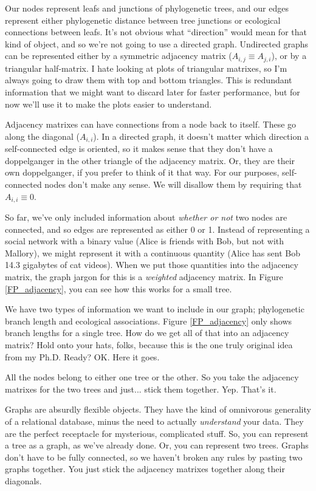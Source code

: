 \documentclass[
10pt, %
a4paper, %
oneside, %
headinclude,footinclude, %
BCOR5mm, %
]{scrartcl}
\begin{document}


Our nodes represent leafs and junctions of phylogenetic trees, and our edges represent either phylogenetic distance between tree junctions or ecological connections between leafs. It's not obvious what ``direction'' would mean for that kind of object, and so we're not going to use a directed graph. Undirected graphs can be represented either by a symmetric adjacency matrix ($A_{i,j} \equiv A_{j,i}$), or by a triangular half-matrix. I hate looking at plots of triangular matrixes, so I'm always going to draw them with top and bottom triangles. This is redundant information that we might want to discard later for faster performance, but for now we'll use it to make the plots easier to understand.

Adjacency matrixes can have connections from a node back to itself. These go along the diagonal ($A_{i,i}$). In a directed graph, it doesn't matter which direction a self-connected edge is oriented, so it makes sense that they don't have a doppelganger in the other triangle of the adjacency matrix. Or, they are their own doppelganger, if you prefer to think of it that way. For our purposes, self-connected nodes don't make any sense. We will disallow them by requiring that $A_{i,i} \equiv 0$.

So far, we've only included information about {\em whether or not} two nodes are connected, and so edges are represented as either 0 or 1. Instead of representing a social network with a binary value (Alice is friends with Bob, but not with Mallory), we might represent it with a continuous quantity (Alice has sent Bob 14.3 gigabytes of cat videos). When we put those quantities into the adjacency matrix, the graph jargon for this is a {\em weighted} adjacency matrix. In Figure \ref{FP_adjacency}, you can see how this works for a small tree. 

We have two types of information we want to include in our graph; phylogenetic branch length and ecological associations. Figure \ref{FP_adjacency} only shows branch lengths for a single tree. How do we get all of that into an adjacency matrix? Hold onto your hats, folks, because this is the one truly original idea from my Ph.D. Ready? OK. Here it goes.

All the nodes belong to either one tree or the other. So you take the adjacency matrixes for the two trees and just... stick them together. Yep. That's it.

Graphs are absurdly flexible objects. They have the kind of omnivorous generality of a relational database, minus the need to actually {\em understand} your data. They are the perfect receptacle for mysterious, complicated stuff. So, you can represent a tree as a graph, as we've already done. Or, you can represent two trees. Graphs don't have to be fully connected, so we haven't broken any rules by pasting two graphs together. You just stick the adjacency matrixes together along their diagonals.
\end{document}
